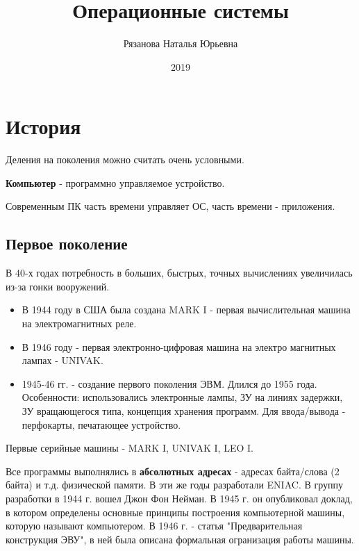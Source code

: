 \documentclass[a4paper, 14pt]{report}
\author{Рязанова Наталья Юрьевна}
\title{Операционные системы}
\date{2019}
\begin{document}
    \maketitle

    \tableofcontents
    \clearpage

    \chapter{История}

    Деления на поколения можно считать очень условными.

    \textbf{Компьютер} - программно управляемое устройство.

    Современным ПК часть времени управляет ОС, часть времени - приложения.

    \section{Первое поколение}

    В 40-х годах потребность в больших, быстрых, точных вычислениях увеличилась из-за гонки вооружений.

    \begin{itemize}

        \item В 1944 году в США была создана MARK I - первая вычислительная машина на электромагнитных реле.

        \item В 1946 году - первая электронно-цифровая машина на электро магнитных лампах - UNIVAK.

        \item 1945-46 гг. - создание первого поколения ЭВМ. Длился до 1955 года. Особенности: использовались электронные лампы, ЗУ на линиях задержки, ЗУ вращающегося типа, концепция хранения программ. Для ввода/вывода - перфокарты, печатающее устройство.
    \end{itemize}

    Первые серийные машины - MARK I, UNIVAK I, LEO I.

    Все программы выполнялись в \textbf{абсолютных адресах} - адресах байта/слова (2 байта) и т.д. физической памяти. В эти же годы разработали ENIAC. В группу разработки в 1944 г. вошел Джон Фон Нейман. В 1945 г. он опубликовал доклад, в котором определены основные принципы построения компьютерной машины, которую называют компьютером. В 1946 г. - статья "Предварительная конструкция ЭВУ", в ней была описана формальная огранизация работы машины.
\end{document}
